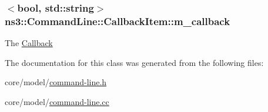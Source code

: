 \subsubsection[{\texorpdfstring{m\+\_\+callback}{m_callback}}]{$<$bool, std\+::string$>$ ns3\+::\+Command\+Line\+::\+Callback\+Item\+::m\+\_\+callback}\hypertarget{classns3_1_1CommandLine_1_1CallbackItem_a12c1d9f1e7035f5f9fb78c446b0c7c90}{}\label{classns3_1_1CommandLine_1_1CallbackItem_a12c1d9f1e7035f5f9fb78c446b0c7c90}
The \hyperlink{classns3_1_1Callback}{Callback} 

The documentation for this class was generated from the following files\+:\begin{DoxyCompactItemize}
\item 
core/model/\hyperlink{command-line_8h}{command-\/line.\+h}\item 
core/model/\hyperlink{command-line_8cc}{command-\/line.\+cc}\end{DoxyCompactItemize}
